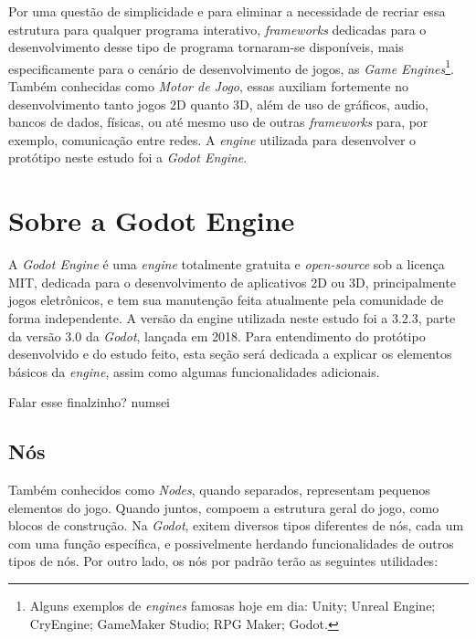 Por uma questão de simplicidade e para eliminar a necessidade de recriar essa estrutura para qualquer programa interativo, \textit{frameworks} dedicadas para o desenvolvimento desse tipo de programa tornaram-se disponíveis, mais especificamente para o cenário de desenvolvimento de jogos, as \textit{Game Engines}\footnote{
    Alguns exemplos de \textit{engines} famosas hoje em dia: Unity; Unreal Engine; CryEngine; GameMaker Studio; RPG Maker; Godot.
}. Também conhecidas como \textit{Motor de Jogo}, essas auxiliam fortemente no desenvolvimento tanto jogos 2D quanto 3D, além de uso de gráficos, audio, bancos de dados, físicas, ou até mesmo uso de outras \textit{frameworks} para, por exemplo, comunicação entre redes. A \textit{engine} utilizada para desenvolver o protótipo neste estudo foi a \textit{Godot Engine}.

\section{Sobre a Godot Engine}

A \textit{Godot Engine} é uma \textit{engine} totalmente gratuita e \textit{open-source} sob a licença MIT, dedicada para o desenvolvimento de aplicativos 2D ou 3D, principalmente jogos eletrônicos, e tem sua manutenção feita atualmente pela comunidade de forma independente. A versão da engine utilizada neste estudo foi a 3.2.3, parte da versão 3.0 da \textit{Godot}, lançada em 2018. Para entendimento do protótipo desenvolvido e do estudo feito, esta seção será dedicada a explicar os elementos básicos da \textit{engine}, assim como algumas funcionalidades adicionais.

Falar esse finalzinho? numsei

\subsection{Nós}

Também conhecidos como \textit{Nodes}, quando separados, representam pequenos elementos do jogo. Quando juntos, compoem a estrutura geral do jogo, como blocos de construção. Na \textit{Godot}, exitem diversos tipos diferentes de nós, cada um com uma função específica, e possivelmente herdando funcionalidades de outros tipos de nós. Por outro lado, os nós por padrão terão as seguintes utilidades:

